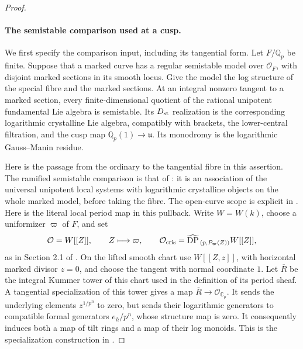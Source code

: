 \begin{proof}
\paragraph{The semistable comparison used at a cusp.}
We first specify the comparison input, including its tangential
form. Let \(F/\mathbb Q_p\) be finite. Suppose that a marked
curve has a regular semistable model over \(\mathcal O_F\),
with disjoint marked sections in its smooth locus. Give the
model the log structure of the special fibre and the marked
sections. At an integral nonzero tangent to a marked section,
every finite-dimensional quotient of the rational unipotent
fundamental Lie algebra is semistable. Its \(D_{\rm st}\)
realization is the corresponding logarithmic crystalline
Lie algebra, compatibly with brackets, the lower-central
filtration, and the cusp map \(\mathbb Q_p(1)\to\mathfrak u\).
Its monodromy is the logarithmic Gauss--Manin residue.

Here is the passage from the ordinary to the tangential fibre
in this assertion. The ramified semistable comparison is that
of \cite[Corollary 5.1 and Theorem 5.2]{fghAIK}: it is an
association of the universal unipotent local systems with
logarithmic crystalline objects on the whole marked model,
before taking the fibre. The open-curve scope is explicit in
\cite[Remark 1.10 and Section 2]{fghAIK}.
Here is the literal local period map in this pullback.
Write \(W=W(k)\), choose a uniformizer \(\varpi\) of \(F\),
and set
\[
 \mathcal O=W[[Z]],\qquad Z\longmapsto\varpi,\qquad
 \mathcal O_{\rm cris}
   =\widehat{\operatorname{DP}}_{\,(p,P_\varpi(Z))}
                                      W[[Z]],
\]
as in Section 2.1 of \cite{fghAIK}.
On the lifted smooth chart use \(W[[Z,z]]\), with
horizontal marked divisor \(z=0\), and choose the
tangent with normal coordinate \(1\).
Let \(\overline R\) be the integral Kummer tower of
this chart used in the definition of its period sheaf.
A tangential specialization of this tower gives a
map \(\overline R\to\mathcal O_{\mathbb C_p}\).
It sends the underlying elements \(z^{1/p^n}\) to
zero, but sends their logarithmic generators to
compatible formal generators \(e_h/p^n\), whose
structure map is zero. It consequently induces
both a map of tilt rings and a map of their log
monoids. This is the specialization construction
in \cite[Section 9.25, especially (9.25.4)--(9.25.7)]
{fghOlssonTangential}.


\end{proof}
